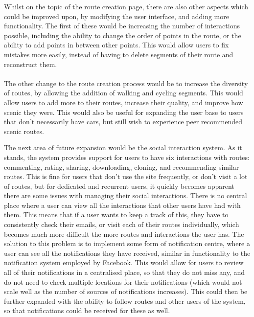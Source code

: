 \noindent 
Whilst on the topic of the route creation page, there are also other aspects which could be improved upon, by modifying the user interface, and adding more functionality. The first of these would be increasing the number of interactions possible, including the ability to change the order of points in the route, or the ability to add points in between other points. This would allow users to fix mistakes more easily, instead of having to delete segments of their route and reconstruct them. 
\ \\
\ \\
The other change to the route creation process would be to increase the diversity of routes, by allowing the addition of walking and cycling segments. This would allow users to add more to their routes, increase their quality, and improve how scenic they were. This would also be useful for expanding the user base to users that don't necessarily have cars, but still wish to experience peer recommended scenic routes.

\newpage 
\noindent 
The next area of future expansion would be the social interaction system. As it stands, the system provides support for users to have six interactions with routes: commenting, rating, sharing, downloading, cloning, and recommending similar routes. This is fine for users that don't use the site frequently, or don't visit a lot of routes, but for dedicated and recurrent users, it quickly becomes apparent there are some issues with managing their social interactions. There is no central place where a user can view all the interactions that other users have had with them. This means that if a user wants to keep a track of this, they have to consistently check their emails, or visit each of their routes individually, which becomes much more difficult the more routes and interactions the user has. The solution to this problem is to implement some form of notification centre, where a user can see all the notifications they have received, similar in functionality to the notification system employed by Facebook. This would allow for users to review all of their notifications in a centralised place, so that they do not miss any, and do not need to check multiple locations for their notifications (which would not scale well as the number of sources of notifications increases). This could then be further expanded with the ability to follow routes and other users of the system, so that notifications could be received for these as well.

